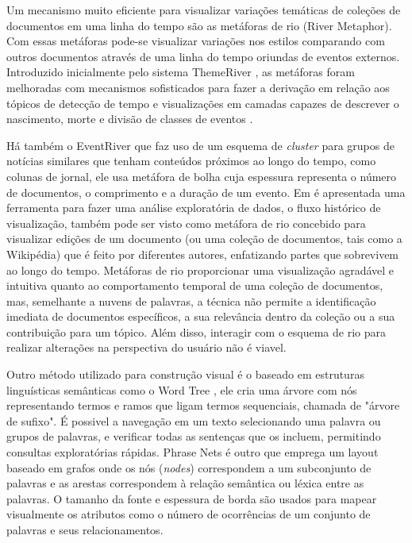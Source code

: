 Um mecanismo muito eficiente para visualizar variações temáticas de coleções de documentos em uma linha do tempo são as metáforas de rio (River Metaphor). Com essas metáforas pode-se visualizar variações nos estilos comparando com outros documentos através de uma linha do tempo oriundas de eventos externos. Introduzido inicialmente pelo sistema ThemeRiver \cite{havre2002themeriver}, as metáforas foram melhoradas com mecanismos sofisticados para fazer a derivação em relação aos tópicos de detecção de tempo \cite{liu2012tiara} e visualizações em camadas capazes de descrever o nascimento, morte e divisão de classes de eventos \cite{cui2011textflow}. 

Há também o EventRiver \cite{luo2012eventriver} que faz uso de um esquema de \textit{cluster} para grupos de notícias similares que tenham conteúdos próximos ao longo do tempo, como colunas de jornal, ele usa metáfora de bolha cuja espessura representa o número de documentos, o comprimento e a duração de um evento. Em  \cite{viegas2004studying} é apresentada uma ferramenta para fazer uma análise exploratória de dados, o fluxo histórico de visualização, também pode ser visto como metáfora de rio concebido para visualizar edições de um documento (ou uma coleção de documentos, tais como a Wikipédia) que é feito por diferentes autores, enfatizando partes que sobrevivem ao longo do tempo. Metáforas de rio proporcionar uma visualização agradável e intuitiva quanto ao comportamento temporal de uma coleção de documentos, mas, semelhante a nuvens de palavras, a técnica não permite a identificação imediata de documentos específicos, a sua relevância dentro da coleção ou a sua contribuição para um tópico. Além disso, interagir com o esquema de rio para realizar alterações na perspectiva do usuário não é viavel.

Outro método utilizado para construção visual é o baseado em estruturas linguísticas semânticas como o Word Tree \cite{wattenberg2008word}, ele cria uma árvore com nós representando termos e ramos que ligam termos sequenciais, chamada de "árvore de sufixo". É possivel a navegação em um texto selecionando uma palavra ou grupos de palavras, e verificar todas as sentenças que os incluem, permitindo consultas exploratórias rápidas. Phrase Nets \cite{van2009mapping} é outro que emprega um layout baseado em grafos onde os nós (\textit{nodes}) correspondem a um subconjunto de palavras e as arestas correspondem à relação semântica ou léxica entre as palavras. O tamanho da fonte e espessura de borda são usados para mapear visualmente os atributos como o número de ocorrências de um conjunto de palavras e seus relacionamentos. 

